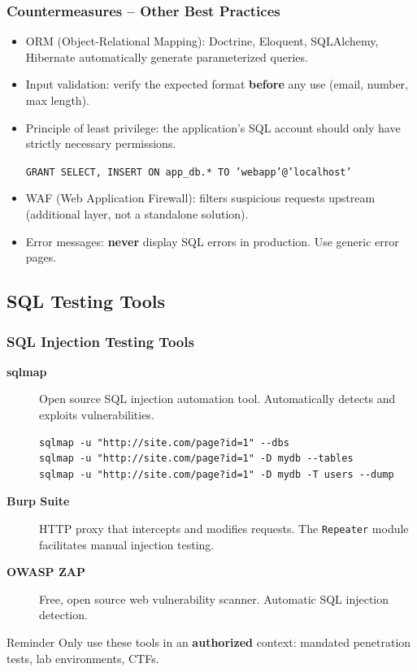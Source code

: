 \documentclass{beamer}
\def\emptyline{\vspace{10pt}}
\begin{document}
\begin{frame}
\frametitle{Countermeasures -- Other Best Practices}

\begin{itemize}
\item \alert{ORM} (Object-Relational Mapping): Doctrine, Eloquent, SQLAlchemy, Hibernate automatically generate parameterized queries.

\item \alert{Input validation}: verify the expected format \textbf{before} any use (email, number, max length).

\item \alert{Principle of least privilege}: the application's SQL account should only have strictly necessary permissions.
\begin{center}
\texttt{GRANT SELECT, INSERT ON app\_db.* TO 'webapp'@'localhost'}
\end{center}

\item \alert{WAF} (Web Application Firewall): filters suspicious requests upstream (additional layer, not a standalone solution).

\item \alert{Error messages}: \textbf{never} display SQL errors in production. Use generic error pages.
\end{itemize}
\end{frame}


\subsection{SQL Testing Tools}

\begin{frame}[fragile]
\frametitle{SQL Injection Testing Tools}

\begin{description}
\item[\textbf{sqlmap}] Open source SQL injection automation tool. Automatically detects and exploits vulnerabilities.
\begin{lstlisting}[basicstyle=\ttfamily\tiny,frame=single]
sqlmap -u "http://site.com/page?id=1" --dbs
sqlmap -u "http://site.com/page?id=1" -D mydb --tables
sqlmap -u "http://site.com/page?id=1" -D mydb -T users --dump
\end{lstlisting}

\item[\textbf{Burp Suite}] HTTP proxy that intercepts and modifies requests. The \texttt{Repeater} module facilitates manual injection testing.

\item[\textbf{OWASP ZAP}] Free, open source web vulnerability scanner. Automatic SQL injection detection.
\end{description}

\emptyline
\begin{alertblock}{Reminder}
Only use these tools in an \textbf{authorized} context: mandated penetration tests, lab environments, CTFs.
\end{alertblock}
\end{frame}
\end{document}

